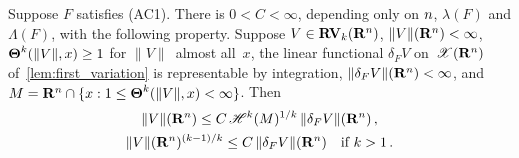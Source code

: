 \documentclass[a4paper,twoside,leqno]{article}
\begin{document}
\begin{theorem}
    \label{thm:MS}
    Suppose $F$ satisfies (AC1). There is $0 < C < \infty$, depending only on $n$,
    $\lambda(F)$ and $\Lambda(F)$, with the following property. Suppose $V \in
    \mathbf{RV}_{k}(\mathbf{R}^{n})$, $\|V\|(\mathbf{R}^{n}) < \infty$, $\boldsymbol{\Theta}^{k}(\|V\|,x) \ge 1$ for
    $\|V\|$~almost all~$x$, the linear functional $\delta_F V$ on~$\mathscr{X}(\mathbf{R}^{n})$
    of~\ref{lem:first_variation} is representable by integration, $\|\delta_F V\|(\mathbf{R}^{n}) <
    \infty$, and $M = \mathbf{R}^{n} \cap \{ x : 1 \le \boldsymbol{\Theta}^{k}(\|V\|,x) < \infty \}$. Then
    \begin{gather}
        \|V\|(\mathbf{R}^{n}) \le C \, \mathscr{H}^{k}(M)^{1/k} \, \|\delta_F V\|(\mathbf{R}^{n}) \,,
        \label{eq:MS:MS} \\
        \|V\|(\mathbf{R}^{n})^{(k - 1)/k} \le C \, \|\delta_F V\|(\mathbf{R}^{n})
        \quad \text{if $k > 1$} \,.
        \label{eq:MS:sobolev}
    \end{gather}
\end{theorem}
\end{document}
